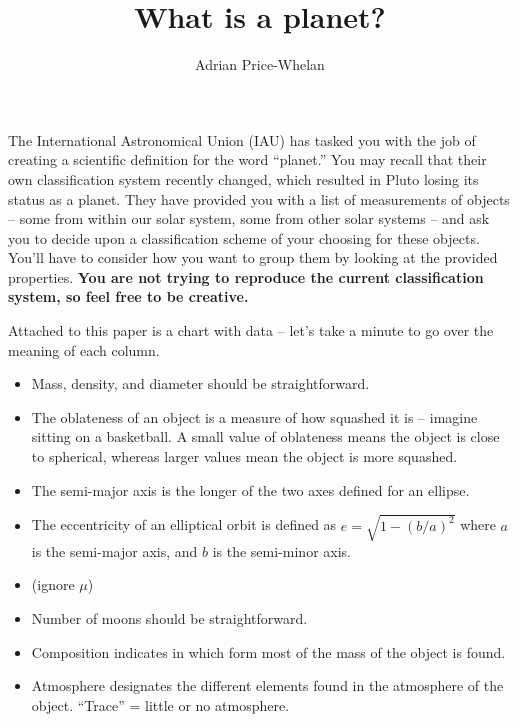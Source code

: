 \documentclass[12pt]{article}
\begin{document}
\title{What is a planet?}
\author{Adrian Price-Whelan}
\date{}%

\maketitle

\thispagestyle{empty}

The International Astronomical Union (IAU) has tasked you with the job of creating a scientific definition for the word ``planet.'' You may recall that their own classification system recently changed, which resulted in Pluto losing its status as a planet. They have provided you with a list of measurements of objects -- some from within our solar system, some from other solar systems -- and ask you to decide upon a classification scheme of your choosing for these objects. You'll have to consider how you want to group them by looking at the provided properties. \textbf{You are not trying to reproduce the current classification system, so feel free to be creative.} 

Attached to this paper is a chart with data -- let's take a minute to go over the meaning of each column. 

\begin{itemize}
	\item Mass, density, and diameter should be straightforward.
	\item  The oblateness of an object is a measure of how squashed it is -- imagine sitting on a basketball. A small value of oblateness means the object is close to spherical, whereas larger values mean the object is more squashed.
	\item The semi-major axis is the longer of the two axes defined for an ellipse. 
	\item The eccentricity of an elliptical orbit is defined as $e = \sqrt{1 - (b/a)^2}$ where $a$ is the semi-major axis, and $b$ is the semi-minor axis.
	\item (ignore $\mu$)
	\item Number of moons should be straightforward.
	\item Composition indicates in which form most of the mass of the object is found. 
	\item Atmosphere designates the different elements found in the atmosphere of the object. ``Trace'' = little or no atmosphere.
\end{itemize}

\clearpage
\end{document}
